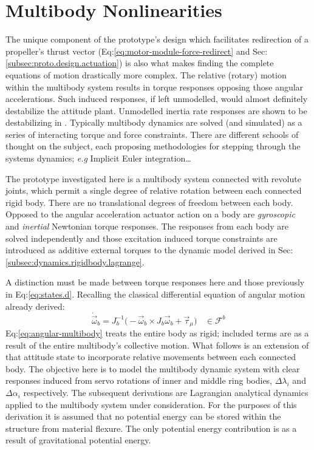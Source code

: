 \section{Multibody Nonlinearities}
\label{sec:dynamics.nonlinearities}
The unique component of the prototype's design which facilitates redirection of a propeller's thrust vector (Eq:\ref{eq:motor-module-force-redirect} and Sec:\ref{subsec:proto.design.actuation}) is also what makes finding the complete equations of motion drastically more complex. The relative (rotary) motion within the multibody system results in torque responses opposing those angular accelerations. Such induced responses, if left unmodelled, would almost definitely destabilize the attitude plant. Unmodelled inertia rate responses are shown to be destabilizing in \cite{inertiaspin}. Typically multibody dynamics are solved (and simulated) as a series of interacting torque and force constraints. There are different schools of thought on the subject, each proposing methodologies for stepping through the systems dynamics; \emph{e.g} Implicit Euler integration\cite{physicallybased,multibodydynamics}\ldots
\par
The prototype investigated here is a multibody system connected with revolute joints, which permit a single degree of relative rotation between each connected rigid body. There are no translational degrees of freedom between each body. Opposed to the angular acceleration actuator action on a body are \emph{gyroscopic} and \emph{inertial} Newtonian torque responses. The responses from each body are solved independently and those excitation induced torque constraints are introduced as additive external torques to the dynamic model derived in Sec:\ref{subsec:dynamics.rigidbody.lagrange}. 
\par
A distinction must be made between torque responses here and those previously in Eq:\ref{eq:states.d}. Recalling the classical differential equation of angular motion already derived:
\begin{equation}\label{eq:angular-multibody}
\dot{\vec{\omega}}_b=J_b^{-1}\big(-\vec{\omega}_b\times J_b\vec{\omega}_b+\vec{\tau}_\mu\big)~~~~\in\mathcal{F}^b
\end{equation}
Eq:\ref{eq:angular-multibody} treats the entire body as rigid; included terms are as a result of the entire multibody's collective motion. What follows is an extension of that attitude state to incorporate relative movements between each connected body. The objective here is to model the multibody dynamic system with clear responses induced from servo rotations of inner and middle ring bodies, $\Delta\lambda_i$ and $\Delta\alpha_i$ respectively. The subsequent derivations are Lagrangian analytical dynamics applied to the multibody system under consideration. For the purposes of this derivation it is assumed that no potential energy can be stored within the structure from material flexure. The only potential energy contribution is as a result of gravitational potential energy.

